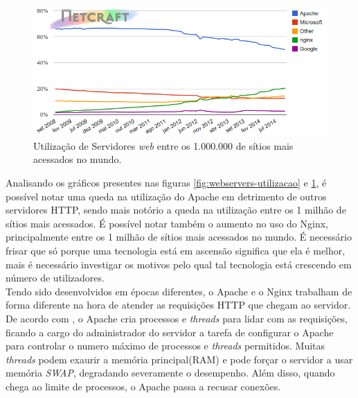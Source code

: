 \begin{figure}[htb]
	\centering
	\includegraphics[width=1\linewidth]{figuras/grafico2} 
	\caption{Utilização de Servidores \textit{web} entre os 1.000.000 de sítios 
	mais acessados no mundo.}
	\label{fig:webservers-utilizacao-milhao}
\end{figure}
Analisando os gráficos presentes nas figuras \ref{fig:webservers-utilizacao} e 
\ref{fig:webservers-utilizacao-milhao}, é possível notar uma queda na 
utilização do Apache em detrimento de outros servidores HTTP, sendo mais 
notório a queda na utilização entre os 1 milhão de sítios mais acessados. É 
possível notar também o aumento no uso do Nginx, principalmente entre os 1 
milhão de sítios mais acessados no mundo. É necessário frisar que só porque uma 
tecnologia está em ascensão significa que ela é melhor, mais é necessário 
investigar os motivos pelo qual tal tecnologia está crescendo em número de 
utilizadores.\\
Tendo sido desenvolvidos em épocas diferentes, o Apache e o Nginx trabalham de 
forma diferente na hora de atender as requisições HTTP que chegam ao servidor.\\
De acordo com , o Apache cria processos e \textit{threads} 
para lidar com as requisições, ficando a cargo do administrador do servidor a 
tarefa de configurar o Apache para controlar o numero máximo de processos e 
\textit{threads} permitidos. Muitas \textit{threads} podem exaurir a memória 
principal(RAM) e pode forçar o servidor a usar memória \textit{SWAP}, 
degradando severamente o desempenho. Além disso, quando chega ao limite de 
processos, o Apache passa a recusar conexões.
